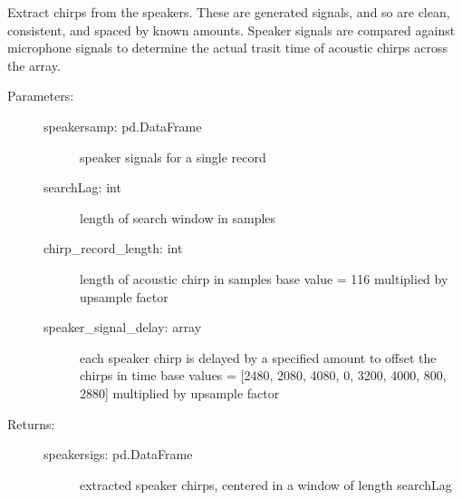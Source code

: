 \documentclass[letterpaper,10pt,english]{sphinxmanual}
\begin{document}
\begin{fulllineitems}
\label{\detokenize{code:ATom.atom_functions.signalOnSpeaker}}
Extract chirps from the speakers. These are generated signals, and
so are clean, consistent, and spaced by known amounts. Speaker
signals are compared against microphone signals to determine the
actual trasit time of acoustic chirps across the array.
\begin{description}
\item[{Parameters:}] \leavevmode\begin{description}
\item[{speakersamp: pd.DataFrame}] \leavevmode
speaker signals for a single record

\item[{searchLag: int}] \leavevmode
length of search window in samples

\item[{chirp\_record\_length: int}] \leavevmode
length of acoustic chirp in samples
base value = 116
multiplied by upsample factor

\item[{speaker\_signal\_delay: array}] \leavevmode
each speaker chirp is delayed by a specified amount
to offset the chirps in time
base values = {[}2480, 2080, 4080,    0, 3200, 4000,  800, 2880{]}
multiplied by upsample factor

\end{description}

\item[{Returns:}] \leavevmode\begin{description}
\item[{speakersigs: pd.DataFrame}] \leavevmode
extracted speaker chirps, centered in a window of length searchLag

\end{description}

\end{description}

\end{fulllineitems}

\end{document}
